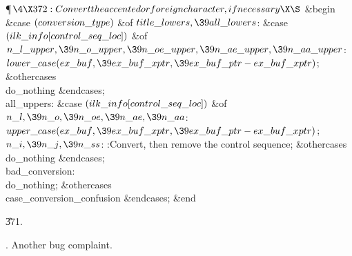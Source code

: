 \Y\P$\4\X372:Convert the accented or foreign character, if necessary\X\S$\6
\&{begin} \&{case} $(\\{conversion\_type})$ \1\&{of}\6
\4$\\{title\_lowers},\39\\{all\_lowers}$: \&{case} $(\\{ilk\_info}[%
\\{control\_seq\_loc}])$ \1\&{of}\6
\4$\\{n\_l\_upper},\39\\{n\_o\_upper},\39\\{n\_oe\_upper},\39\\{n\_ae\_upper},%
\39\\{n\_aa\_upper}$: $\\{lower\_case}(\\{ex\_buf},\39\\{ex\_buf\_xptr},\39%
\\{ex\_buf\_ptr}-\\{ex\_buf\_xptr})$;\6
\4\&{othercases} \\{do\_nothing}\2\6
\&{endcases};\6
\4\\{all\_uppers}: \&{case} $(\\{ilk\_info}[\\{control\_seq\_loc}])$ \1%
\&{of}\6
\4$\\{n\_l},\39\\{n\_o},\39\\{n\_oe},\39\\{n\_ae},\39\\{n\_aa}$: $\\{upper%
\_case}(\\{ex\_buf},\39\\{ex\_buf\_xptr},\39\\{ex\_buf\_ptr}-\\{ex\_buf%
\_xptr})$;\6
\4$\\{n\_i},\39\\{n\_j},\39\\{n\_ss}$: :Convert, then remove the
control sequence\X;\6
\4\&{othercases} \\{do\_nothing}\2\6
\&{endcases};\6
\4\\{bad\_conversion}: \\{do\_nothing};\6
\4\&{othercases} \\{case\_conversion\_confusion}\2\6
\&{endcases};\6
\&{end}\par
\U371.\fi

.
Another bug complaint.

